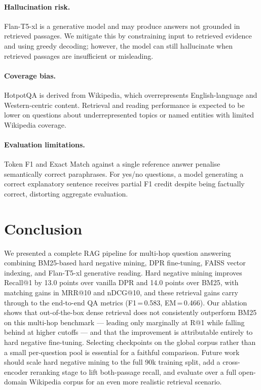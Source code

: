 \documentclass{llncs}
\begin{document}
\paragraph{Hallucination risk.}
Flan-T5-xl is a generative model and may produce answers not grounded in
retrieved passages. We mitigate this by constraining input to retrieved
evidence and using greedy decoding; however, the model can still
hallucinate when retrieved passages are insufficient or misleading.

\paragraph{Coverage bias.}
HotpotQA is derived from Wikipedia, which overrepresents English-language
and Western-centric content. Retrieval and reading performance is expected
to be lower on questions about underrepresented topics or named entities
with limited Wikipedia coverage.

\paragraph{Evaluation limitations.}
Token F1 and Exact Match against a single reference answer penalise
semantically correct paraphrases. For yes/no questions, a model generating
a correct explanatory sentence receives partial F1 credit despite being
factually correct, distorting aggregate evaluation.

\section{Conclusion}

We presented a complete RAG pipeline for multi-hop question answering
combining BM25-based hard negative mining, DPR fine-tuning, FAISS vector
indexing, and Flan-T5-xl generative reading. Hard negative mining improves
Recall@1 by 13.0 points over vanilla DPR and 14.0 points over BM25, with
matching gains in MRR@10 and nDCG@10, and these retrieval gains carry through
to the end-to-end QA metrics (F1\,=\,0.583, EM\,=\,0.466). Our ablation shows
that out-of-the-box dense retrieval does not consistently outperform BM25 on
this multi-hop benchmark --- leading only marginally at R@1 while falling
behind at higher cutoffs --- and that the improvement is attributable entirely
to hard negative fine-tuning. Selecting checkpoints on the global corpus
rather than a small per-question pool is essential for a faithful comparison.
Future work should scale hard negative mining to the full 90k training split,
add a cross-encoder reranking stage to lift both-passage recall, and evaluate
over a full open-domain Wikipedia corpus for an even more realistic retrieval
scenario.
\end{document}
